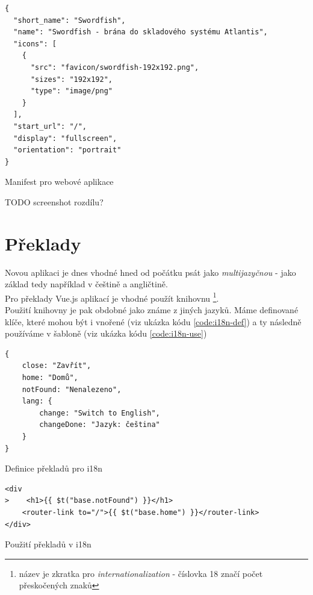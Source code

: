 \begin{listing}[H]
\begin{verbatim}
{
  "short_name": "Swordfish",
  "name": "Swordfish - brána do skladového systému Atlantis",
  "icons": [
    {
      "src": "favicon/swordfish-192x192.png",
      "sizes": "192x192",
      "type": "image/png"
    }
  ],
  "start_url": "/",
  "display": "fullscreen",
  "orientation": "portrait"
}
\end{verbatim}
\caption{Manifest pro webové aplikace} \label{code:webapp-manifest}
\end{listing}

TODO screenshot rozdílu?


\section{Překlady}

Novou aplikaci je dnes vhodné hned od počátku psát jako \emph{multijazyčnou} - jako základ tedy například v češtině a angličtině.\\
Pro překlady Vue.js aplikací je vhodné použít knihovnu \footnote{název je zkratka pro \emph{internationalization} - číslovka 18 značí počet přeskočených znaků}. \cite{vue-i18n}\\
Použití knihovny je pak obdobné jako známe z jiných jazyků. Máme definované klíče, které mohou být i vnořené (viz ukázka kódu \ref{code:i18n-def}) a ty následně používáme v šabloně (viz ukázka kódu \ref{code:i18n-use})
\begin{listing}[h]
\begin{verbatim}
{
    close: "Zavřít",
    home: "Domů",
    notFound: "Nenalezeno",
    lang: {
        change: "Switch to English",
        changeDone: "Jazyk: čeština"
    }
}
\end{verbatim}
\caption{Definice překladů pro i18n} \label{code:i18n-def}
\end{listing}

\begin{listing}[h]
\begin{verbatim}
<div
>    <h1>{{ $t("base.notFound") }}</h1>
    <router-link to="/">{{ $t("base.home") }}</router-link>
</div>
\end{verbatim}
\caption{Použití překladů v i18n} \label{code:i18n-use}
\end{listing}

